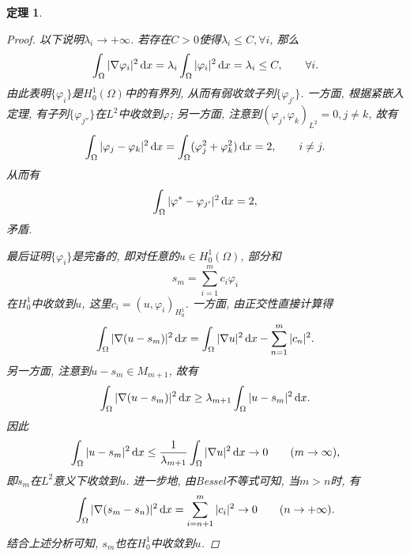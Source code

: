 \documentclass[12pt,a4paper]{article}
\newtheorem{theorem}{定理}[section]
\begin{document}
\begin{theorem}
\begin{proof}
        以下说明$\lambda_i \rightarrow +\infty$. 若存在$C > 0$使得$\lambda_i \leq C, \forall i$, 那么 
        \begin{equation*}
            \int_{\Omega}|\nabla\varphi_i|^2 \,{\rm d}x = \lambda_i\int_{\Omega}|\varphi_i|^2 \,{\rm d}x = \lambda_i \leq C, \qquad \forall i.
        \end{equation*}
        由此表明$\{\varphi_i\}$是$H_0^1(\Omega)$中的有界列, 从而有弱收敛子列$\{\varphi_{j'}\}$.
        一方面, 根据紧嵌入定理, 有子列$\{\varphi_{j''}\}$在$L^2$中收敛到$\varphi$; 另一方面, 注意到$(\varphi_j, \varphi_k)_{L^2} = 0, j \neq k$, 故有 
        \begin{equation*}
            \int_{\Omega}|\varphi_j - \varphi_k|^2 \,{\rm d}x = \int_{\Omega}(\varphi_j^2 + \varphi_k^2) \,{\rm d}x = 2, \qquad i \neq j.
        \end{equation*}
        从而有 
        \begin{equation*}
            \int_{\Omega}|\varphi^* - \varphi_{j'}|^2 \,{\rm d}x = 2,
        \end{equation*}
        矛盾.

        最后证明$\{\varphi_i\}$是完备的, 即对任意的$u \in H_0^1(\Omega)$, 部分和
        \begin{equation*}
            s_m = \sum_{i = 1}^mc_i\varphi_i
        \end{equation*}
        在$H_0^1$中收敛到$u$, 这里$c_i = (u, \varphi_i)_{H_0^1}$. 一方面, 由正交性直接计算得 
        \begin{align*}
            \int_{\Omega}|\nabla(u - s_m)|^2 \,{\rm d}x = \int_{\Omega}|\nabla u|^2 \,{\rm d}x - \sum_{n = 1}^m|c_n|^2.
        \end{align*}
        另一方面, 注意到$u - s_m \in M_{m + 1}$, 故有 
        \begin{equation*}
            \int_{\Omega}|\nabla(u - s_m)|^2 \,{\rm d}x \geq \lambda_{m + 1}\int_{\Omega}|u - s_m|^2 \,{\rm d}x.
        \end{equation*}
        因此 
        \begin{equation*}
            \int_{\Omega}|u - s_m|^2 \,{\rm d}x \leq \frac{1}{\lambda_{m + 1}}\int_{\Omega}|\nabla u|^2 \,{\rm d}x \rightarrow 0 \qquad (m \rightarrow \infty),
        \end{equation*}
        即$s_m$在$L^2$意义下收敛到$u$. 进一步地, 由Bessel不等式可知, 当$m > n$时, 有 
        \begin{equation*}
            \int_{\Omega}|\nabla(s_m - s_n)|^2 \,{\rm d}x = \sum_{i = n + 1}^m|c_i|^2 \rightarrow 0 \qquad (n \rightarrow +\infty).
        \end{equation*}
        结合上述分析可知, $s_m$也在$H_0^1$中收敛到$u$.
    \end{proof}
\end{theorem}
\end{document}
